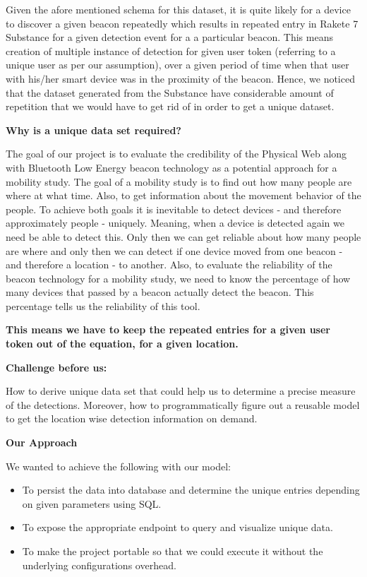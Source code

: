 Given the afore mentioned schema for this dataset, it is quite likely for a device to discover a given beacon repeatedly which results in repeated entry in Rakete 7 Substance for a given detection event for a a particular beacon. This means creation of multiple instance of detection for given user token (referring to a unique user as per our assumption), over a given period of time when that user with his/her smart device was in the proximity of the beacon.
Hence, we noticed that the dataset generated from the Substance have considerable amount of repetition that we would have to get rid of in order to get a unique dataset.

\textbf{Why is a unique data set required?}
\par The goal of our project is to evaluate the credibility of the Physical Web along with Bluetooth Low Energy beacon technology as a potential approach for a mobility study. The goal of a mobility study is to find out how many people are where at what time. Also, to get information about the movement behavior of the people. To achieve both goals it is inevitable to detect devices - and therefore approximately people - uniquely. Meaning, when a device is detected again we need be able to detect this. Only then we can get reliable about how many people are where and only then we can detect if one device moved from one beacon - and therefore a location - to another.
Also, to evaluate the reliability of the beacon technology for a mobility study, we need to know the percentage of how many devices that passed by a beacon actually detect the beacon. This percentage tells us the reliability of this tool.
\par \textbf{This means we have to keep the repeated entries for a given user token out of the equation, for a given location.} 

\textbf{Challenge before us:}
\par How to derive unique data set that could help us to determine a precise measure of the detections. Moreover, how to programmatically figure out a reusable model to get the location wise detection information on demand.

\textbf{Our Approach}
\par We wanted to achieve the following with our model:
\begin{itemize}
	\item To persist the data into database and determine the unique entries depending on given parameters using SQL.
	\item To expose the appropriate endpoint to query and visualize unique data.
	\item To make the project portable so that we could execute it without the underlying configurations overhead.
\end{itemize}

